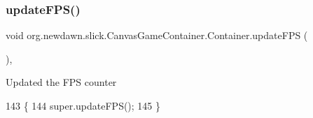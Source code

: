 \subsubsection{\texorpdfstring{update\+F\+P\+S()}{updateFPS()}}
{\footnotesize\ttfamily void org.\+newdawn.\+slick.\+Canvas\+Game\+Container.\+Container.\+update\+F\+PS (\begin{DoxyParamCaption}{ }\end{DoxyParamCaption})\hspace{0.3cm}{\ttfamily [inline]}, {\ttfamily [protected]}}

Updated the F\+PS counter 
\begin{DoxyCode}
143                                    \{
144             super.updateFPS();
145         \}
\end{DoxyCode}
